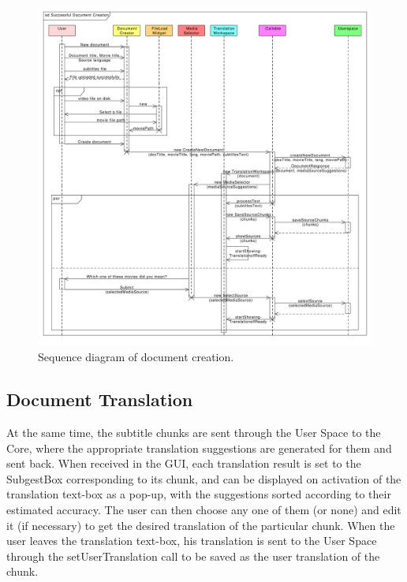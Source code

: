 \begin{figure}[h]
\begin{center}
\includegraphics[scale=0.40]{figures/document_creation_sequence_GUI.pdf}
\end{center}
\caption{Sequence diagram of document creation.}\label{gui:sd:document_creation}
\end{figure}

\subsection{Document Translation}

At the same time, the subtitle chunks are sent through the User Space to the Core, where the appropriate translation suggestions are generated for them and sent back. When received in the GUI, each translation result is set to the SubgestBox corresponding to its chunk, and can be displayed on activation of the translation text-box as a pop-up, with the suggestions sorted according to their estimated accuracy.
The user can then choose any one of them (or none) and edit it (if necessary) to get the desired translation of the particular chunk. When the user leaves the translation text-box, his translation is sent to the User Space through the setUserTranslation call to be saved as the user translation of the chunk.

